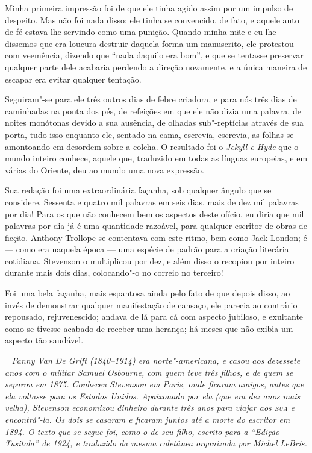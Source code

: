 Minha primeira impressão foi de que ele tinha agido assim por um impulso
de despeito.  Mas não foi nada disso; ele tinha se convencido, de
fato, e aquele auto de fé estava lhe servindo como uma punição.  Quando
minha mãe e eu lhe dissemos que era loucura destruir daquela forma um
manuscrito, ele protestou com veemência, dizendo que “nada daquilo era
bom”, e que se tentasse preservar qualquer parte dele acabaria perdendo
a direção novamente, e a única maneira de escapar era evitar qualquer
tentação.

Seguiram"-se para ele três outros dias de febre criadora, e para nós três
dias de caminhadas na ponta dos pés, de refeições em que ele não dizia
uma palavra, de noites monótonas devido a sua ausência, de olhadas
sub"-reptícias através de sua porta, tudo isso enquanto ele, sentado na
cama, escrevia, escrevia, as folhas se amontoando em desordem sobre a
colcha. O resultado foi o \textit{Jekyll e Hyde} que o mundo
inteiro conhece, aquele que, traduzido em todas as línguas europeias, e
em várias do Oriente, deu ao mundo uma nova expressão.

Sua redação foi uma extraordinária façanha, sob qualquer ângulo que se
considere.  Sessenta e quatro mil palavras em seis dias, mais de dez
mil palavras por dia!  Para os que não conhecem bem os aspectos deste
ofício, eu diria que mil palavras por dia já é uma quantidade razoável,
para qualquer escritor de obras de ficção.  Anthony Trollope se
contentava com este ritmo, bem como Jack London; é --- como era naquela
época --- uma espécie de padrão para a criação literária cotidiana. 
Stevenson o multiplicou por dez, e além disso o recopiou por inteiro
durante mais dois dias, colocando"-o no correio no terceiro!

Foi uma bela façanha, mais espantosa ainda pelo fato de que depois
disso, ao invés de demonstrar qualquer manifestação de cansaço, ele
parecia ao contrário repousado, rejuvenescido; andava de lá para cá com
aspecto jubiloso, e exultante como se tivesse acabado de receber uma
herança; há meses que não exibia um aspecto tão saudável. 

\pagebreak
\thispagestyle{empty}
\clearpage
\ifodd\thepage ~ \clearpage\else\relax\fi
\thispagestyle{empty}
\mbox{}\vfill
{\noindent\itshape Fanny Van De Grift (1840--1914) era norte"-americana, e casou aos
dezessete anos com o militar Samuel Osbourne, com quem teve três
filhos, e de quem se separou em 1875.  Conheceu Stevenson em
Paris, onde ficaram amigos, antes que ela voltasse para os Estados
Unidos.  Apaixonado por ela (que era dez anos mais velha), Stevenson
economizou dinheiro durante três anos para viajar aos \emph{\textsc{eua}} e
encontrá"-la.  Os dois se casaram e ficaram juntos até a morte do
escritor em 1894. O texto que se segue foi, como o de seu filho,
escrito para a “Edição Tusitala” de 1924, e traduzido da mesma
coletânea organizada por Michel LeBris.}

